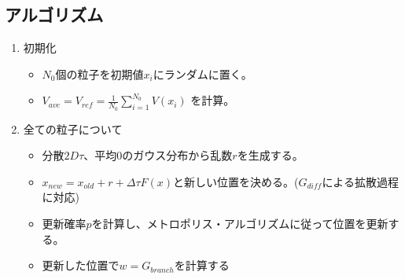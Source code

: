 \documentclass[dvipdfmx]{beamer}
\begin{document}
    \subsection{アルゴリズム}
    \begin{frame}{\insertsubsection}
        \begin{enumerate}
            \item 初期化
            \begin{itemize}
                \item $N_0$個の粒子を初期値$x_i$にランダムに置く。
                \item $V_{ave} = V_{ref} = \frac{1}{N_0} \sum_{i=1}^{N_0}V(x_i)$ を計算。
            \end{itemize}

            \item 全ての粒子について
            \begin{itemize}
                \item 分散$2D\tau$、平均$0$のガウス分布から乱数$r$を生成する。
                \item $x_{new} = x_{old} + r + \Delta\tau F(x)$と新しい位置を決める。($G_{diff}$による拡散過程に対応)
                \item 更新確率$p$を計算し、メトロポリス・アルゴリズムに従って位置を更新する。
                \item 更新した位置で$w = G_{branch}$を計算する

            \end{itemize}

        \end{enumerate}

    \end{frame}
\end{document}
